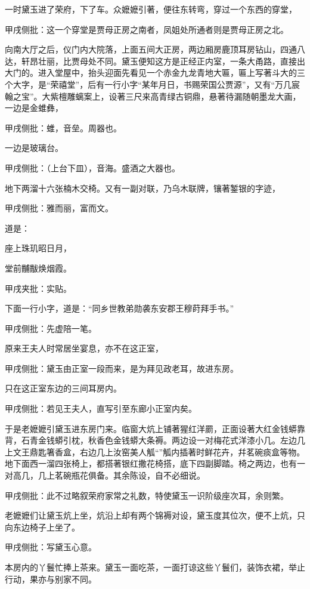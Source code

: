 \begin{parag}
    一时黛玉进了荣府，下了车。众嬷嬷引著，便往东转弯，穿过一个东西的穿堂，\begin{note}甲戌侧批：这一个穿堂是贾母正房之南者，凤姐处所通者则是贾母正房之北。\end{note}向南大厅之后，仪门内大院落，上面五间大正房，两边厢房鹿顶耳房钻山，四通八达，轩昂壮丽，比贾母处不同。黛玉便知这方是正经正内室，一条大甬路，直接出大门的。进入堂屋中，抬头迎面先看见一个赤金九龙青地大匾，匾上写著斗大的三个大字，是“荣禧堂”，后有一行小字“某年月日，书赐荣国公贾源”，又有“万几宸翰之宝”。大紫檀雕螭案上，设著三尺来高青绿古铜鼎，悬著待漏随朝墨龙大画，一边是金蜼彝，\begin{note}甲戌侧批：蜼，音垒。周器也。\end{note}一边是玻璃台。\begin{note}甲戌侧批：（上台下皿），音海。盛酒之大器也。\end{note}地下两溜十六张楠木交椅。又有一副对联，乃乌木联牌，镶著錾银的字迹，\begin{note}甲戌侧批：雅而丽，富而文。\end{note}道是：
\end{parag}
\begin{poem}
    \begin{pl} 座上珠玑昭日月， \end{pl}

    \begin{pl}堂前黼黻焕烟霞。\end{pl}\begin{note}甲戌夹批：实贴。\end{note}
\end{poem}
\begin{parag}
    下面一行小字，道是：“同乡世教弟勋袭东安郡王穆莳拜手书。”\begin{note}甲戌侧批：先虚陪一笔。\end{note}
\end{parag}


\begin{parag}
    原来王夫人时常居坐宴息，亦不在这正室，\begin{note}甲戌侧批：黛玉由正室一段而来，是为拜见政老耳，故进东房。\end{note}只在这正室东边的三间耳房内。\begin{note}甲戌侧批：若见王夫人，直写引至东廊小正室内矣。\end{note}于是老嬷嬷引黛玉进东房门来。临窗大炕上铺著猩红洋罽，正面设著大红金钱蟒靠背，石青金钱蟒引枕，秋香色金钱蟒大条褥。两边设一对梅花式洋漆小几。左边几上文王鼎匙箸香盒，右边几上汝窑美人觚“”觚内插著时鲜花卉，幷茗碗痰盒等物。地下面西一溜四张椅上，都搭著银红撒花椅搭，底下四副脚踏。椅之两边，也有一对高几，几上茗碗瓶花俱备。其余陈设，自不必细说。\begin{note}甲戌侧批：此不过略叙荣府家常之礼数，特使黛玉一识阶级座次耳，余则繁。\end{note}老嬷嬷们让黛玉炕上坐，炕沿上却有两个锦褥对设，黛玉度其位次，便不上炕，只向东边椅子上坐了。\begin{note}甲戌侧批：写黛玉心意。\end{note}本房内的丫鬟忙捧上茶来。黛玉一面吃茶，一面打谅这些丫鬟们，装饰衣裙，举止行动，果亦与别家不同。
\end{parag}


